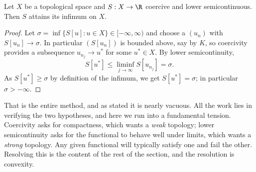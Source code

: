 \begin{center}
\end{center}

\begin{theorem}\label{thm:directabstract}
	Let $X$ be a topological space and $S : X \to \R$ coercive and lower semicontinuous. Then $S$ attains its infimum on $X$.
\end{theorem}

\begin{proof}
	Let $\sigma = \inf\{S[u] : u \in X\} \in [-\infty,\infty)$ and choose a  $(u_n)$ with $S[u_n]\to\sigma$. In particular $(S[u_n])$ is bounded above, say by $K$, so coercivity provides a subsequence $u_{n_j}\to u^*$ for some $u^*\in X$. By lower semicontinuity,
	$$S[u^*]\le \liminf_{j\to\infty}S[u_{n_j}] = \sigma.$$
	As $S[u^*]\ge\sigma$ by definition of the infimum, we get $S[u^*] = \sigma$; in particular $\sigma > -\infty$.
\end{proof}

That is the entire method, and as stated it is nearly vacuous. All the work lies in verifying the two hypotheses, and here we run into a fundamental tension. Coercivity asks for compactness, which wants a \emph{weak} topology; lower semicontinuity asks for the functional to behave well under limits, which wants a \emph{strong} topology. Any given functional will typically satisfy one and fail the other. Resolving this is the content of the rest of the section, and the resolution is convexity.

